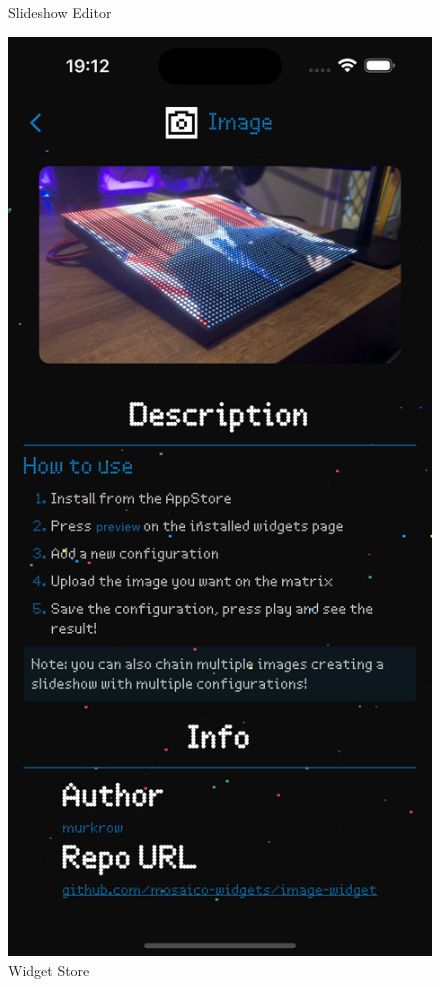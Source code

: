 \begin{figure}[h]
\begin{minipage}[b]{0.24\textwidth}
        \caption*{Slideshow Editor}
    \end{minipage}
    \begin{minipage}[b]{0.24\textwidth}
        \centering
        \includegraphics[width=\textwidth]{tesi/img/client_demo/store.png}
        \caption*{Widget Store}
    \end{minipage}
\end{figure}

